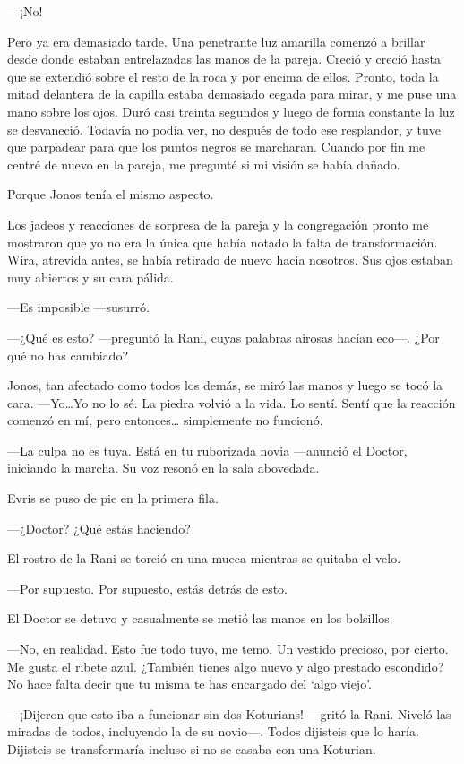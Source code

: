 ---¡No!

Pero ya era demasiado tarde. Una penetrante luz amarilla comenzó a
brillar desde donde estaban entrelazadas las manos de la pareja. Creció
y creció hasta que se extendió sobre el resto de la roca y por encima de
ellos. Pronto, toda la mitad delantera de la capilla estaba demasiado
cegada para mirar, y me puse una mano sobre los ojos. Duró casi treinta
segundos y luego de forma constante la luz se desvaneció. Todavía no
podía ver, no después de todo ese resplandor, y tuve que parpadear para
que los puntos negros se marcharan. Cuando por fin me centré de nuevo en
la pareja, me pregunté si mi visión se había dañado.

Porque Jonos tenía el mismo aspecto.

Los jadeos y reacciones de sorpresa de la pareja y la congregación
pronto me mostraron que yo no era la única que había notado la falta de
transformación. Wira, atrevida antes, se había retirado de nuevo hacia
nosotros. Sus ojos estaban muy abiertos y su cara pálida.

---Es imposible ---susurró.

---¿Qué es esto? ---preguntó la Rani, cuyas palabras airosas hacían
eco---. ¿Por qué no has cambiado?

Jonos, tan afectado como todos los demás, se miró las manos y luego se
tocó la cara. ---Yo\ldots{}Yo no lo sé. La piedra volvió a la vida. Lo
sentí. Sentí que la reacción comenzó en mí, pero entonces\ldots{}
simplemente no funcionó.

---La culpa no es tuya. Está en tu ruborizada novia ---anunció el
Doctor, iniciando la marcha. Su voz resonó en la sala abovedada.

Evris se puso de pie en la primera fila.

---¿Doctor? ¿Qué estás haciendo?

El rostro de la Rani se torció en una mueca mientras se quitaba el velo.

---Por supuesto. Por supuesto, estás detrás de esto.

El Doctor se detuvo y casualmente se metió las manos en los bolsillos.

---No, en realidad. Esto fue todo tuyo, me temo. Un vestido precioso,
por cierto. Me gusta el ribete azul. ¿También tienes algo nuevo y algo
prestado escondido? No hace falta decir que tu misma te has encargado
del `algo viejo'.

---¡Dijeron que esto iba a funcionar sin dos Koturians! ---gritó la
Rani. Niveló las miradas de todos, incluyendo la de su novio---. Todos
dijisteis que lo haría. Dijisteis se transformaría incluso si no se
casaba con una Koturian.

